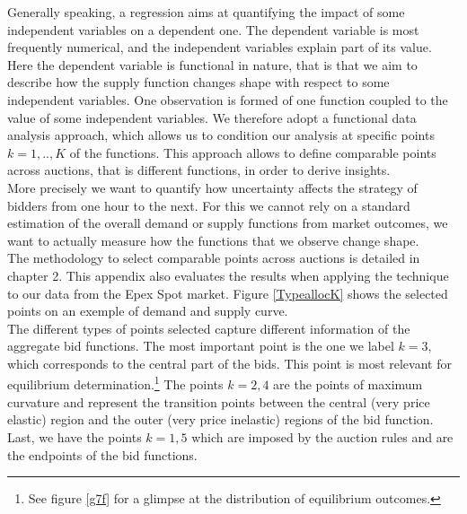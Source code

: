 Generally speaking, a regression aims at quantifying the impact of some independent variables on a dependent one. The dependent variable is most frequently numerical, and the independent variables explain part of its value. Here the dependent variable is functional in nature, that is that we aim to describe how the supply function changes shape with respect to some independent variables. One observation is formed of one function coupled to the value of some independent variables. We therefore adopt a functional data analysis approach, which allows us to condition our analysis at specific points $k=1,..,K$ of the functions.
This approach allows to define comparable points across auctions, that is different functions, in order to derive insights.   \\

More precisely we want to quantify how uncertainty affects the strategy of bidders from one hour to the next. For this we cannot rely on a standard estimation of the overall demand or supply functions from market outcomes, we want to actually measure how the functions that we observe change shape. \\

The methodology to select comparable points across auctions is detailed in chapter 2. 
This appendix also evaluates the results when applying the technique to our data from the Epex Spot market. Figure \ref{TypeallocK} shows the selected points on an exemple of demand and supply curve. \\

The different types of points selected capture different information of the aggregate bid functions. The most important point is the one we label $k=3$, which corresponds to the central part of the bids. This point is most relevant for equilibrium determination.\footnote{See figure \ref{g7f} for a glimpse at the distribution of equilibrium outcomes.} The points $k=2,4$ are the points of maximum curvature and represent the transition points between the central (very price elastic) region and the outer (very price inelastic) regions of the bid function. Last, we have the points $k=1,5$ which are imposed by the auction rules and are the endpoints of the bid functions. \\


